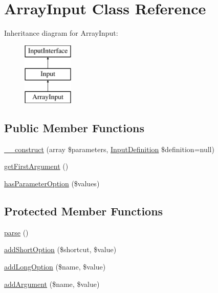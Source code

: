 \hypertarget{class_symfony_1_1_components_1_1_console_1_1_input_1_1_array_input}{
\section{ArrayInput Class Reference}
\label{class_symfony_1_1_components_1_1_console_1_1_input_1_1_array_input}
}
Inheritance diagram for ArrayInput:\begin{figure}[H]
\begin{center}
\leavevmode
\includegraphics[height=3.000000cm]{class_symfony_1_1_components_1_1_console_1_1_input_1_1_array_input}
\end{center}
\end{figure}
\subsection*{Public Member Functions}
\begin{DoxyCompactItemize}
\item 
\hyperlink{class_symfony_1_1_components_1_1_console_1_1_input_1_1_array_input_ad6425b68eddcc77b78b6195ac03ffee5}{\_\-\_\-construct} (array \$parameters, \hyperlink{class_symfony_1_1_components_1_1_console_1_1_input_1_1_input_definition}{InputDefinition} \$definition=null)
\item 
\hyperlink{class_symfony_1_1_components_1_1_console_1_1_input_1_1_array_input_af2c0efe177067f350eb7d027d5cb0d48}{getFirstArgument} ()
\item 
\hyperlink{class_symfony_1_1_components_1_1_console_1_1_input_1_1_array_input_a0e8e5ab4feedf51eb06791d59c730463}{hasParameterOption} (\$values)
\end{DoxyCompactItemize}
\subsection*{Protected Member Functions}
\begin{DoxyCompactItemize}
\item 
\hyperlink{class_symfony_1_1_components_1_1_console_1_1_input_1_1_array_input_a38d99acc70a1d8fd8f94455743b2d237}{parse} ()
\item 
\hyperlink{class_symfony_1_1_components_1_1_console_1_1_input_1_1_array_input_a7c82bd001b1072d631bc9f692e6522ef}{addShortOption} (\$shortcut, \$value)
\item 
\hyperlink{class_symfony_1_1_components_1_1_console_1_1_input_1_1_array_input_aa82dc00580e8f0388fff7e987c2b4aa8}{addLongOption} (\$name, \$value)
\item 
\hyperlink{class_symfony_1_1_components_1_1_console_1_1_input_1_1_array_input_a41e29bad541dee271289558674342be4}{addArgument} (\$name, \$value)
\end{DoxyCompactItemize}
